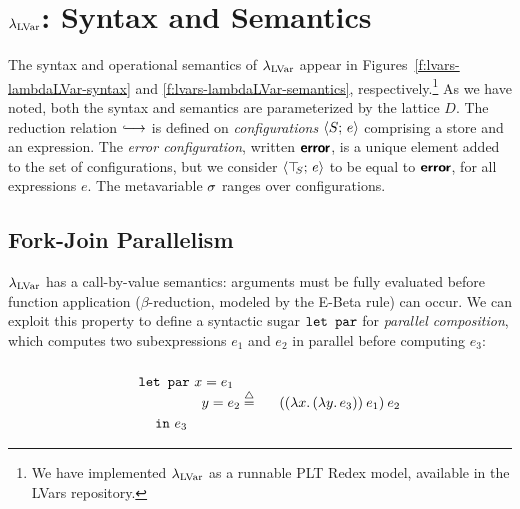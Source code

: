 \section{$\lambda_{\textrm{LVar}}$: Syntax and Semantics}\label{s:lvars-lambdalvar}


\FigLambdaLVarGrammar

\FigLambdaLVarSemantics

The syntax and operational semantics of $\lambda_{\textrm{LVar}}$ appear in
Figures~\ref{f:lvars-lambdaLVar-syntax} and
\ref{f:lvars-lambdaLVar-semantics}, respectively.\footnote{We have
  implemented $\lambda_{\textrm{LVar}}$ as a runnable PLT Redex \cite{redex-book}
  model, available in the LVars repository.}  As we have noted, both
the syntax and semantics are parameterized by the lattice $D$.  The
reduction relation $\parstepsto$ is defined on \emph{configurations}
$\langle S;\, e \rangle$ comprising a store and an expression.  The \emph{error
  configuration}, written $\textbf{\textsf{error}}$, is a unique element added to the
set of configurations, but we consider $\langle \top\hspace{-0.85mm}_{S};\, e \rangle$ to be equal
to $\textbf{\textsf{error}}$, for all expressions $e$.  The metavariable $\sigma$ ranges
over configurations.


\subsection{Fork-Join Parallelism}\label{subsection:fork-join}

$\lambda_{\textrm{LVar}}$ has a call-by-value semantics: arguments must be fully
evaluated before function application ($\beta$-reduction, modeled by
the {\sc E-Beta} rule) can occur.  We can exploit this property to
define a syntactic sugar $\mbox{\texttt{\mbox{\texttt{let}}~\mbox{\texttt{par}}}}$ for \emph{parallel composition},
which computes two subexpressions $e_1$ and $e_2$ in parallel before
computing $e_3$:
\begin{displaymath}
\begin{minipage}[b]{0.8in}
  \begin{equation*}
\begin{split}
& \LETPAR ~x = e_1 \\ 
& \letparspace ~y = e_2 \\
& \letspace \IN~e_3 
\end{split}
\end{equation*}
\end{minipage}
\begin{minipage}[b]{0.6in}
\centering
$\defeq$
\end{minipage}
\begin{minipage}[b]{1in}
\begin{equation*}
  \app{(\app{(\lam{x}{(\lam{y}{e_3})})}{e_1})}{e_2}
\end{equation*}
\end{minipage}
\end{displaymath}

